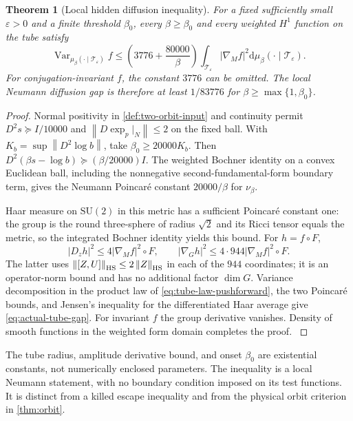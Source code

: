 \documentclass[11pt,oneside,openany]{book}
\newtheorem{theorem}{Theorem}[chapter]
\theoremstyle{definition}
\theoremstyle{remark}
\newcommand{\dd}{\mathrm d}
\newcommand{\Var}{\operatorname{Var}}
\newcommand{\SU}{\mathrm{SU}}
\newcommand{\norm}[1]{\left\lVert#1\right\rVert}
\newcommand{\src}[2]{\cite[#2]{#1}}
\begin{document}
\begin{theorem}[Local hidden diffusion inequality]
\label{thm:actual-tube-gap}
For a fixed sufficiently small $\varepsilon>0$ and a finite threshold
$\beta_0$, every $\beta\ge\beta_0$ and every weighted $H^1$ function
on the tube satisfy
\begin{equation}\label{eq:actual-tube-gap}
 \Var_{\mu_\beta(\cdot\mid\mathcal T_\varepsilon)}f
 \le\left(3776+\frac{80000}{\beta}\right)
     \int_{\mathcal T_\varepsilon}|\nabla_Mf|^2
                              \dd\mu_\beta(\cdot\mid\mathcal T_\varepsilon).
\end{equation}
For conjugation-invariant $f$, the constant $3776$ can be omitted.
The local Neumann diffusion gap is therefore at least $1/83776$ for
$\beta\ge\max\{1,\beta_0\}$.
\end{theorem}
\begin{proof}
Normal positivity in \cref{def:two-orbit-input} and continuity permit
$D^2s\succeq I/10000$ and $\norm{D\exp_p|_N}\le2$ on the fixed
ball. With $K_b=\sup\norm{D^2\log b}$, take
$\beta_0\ge20000K_b$. Then
$D^2(\beta s-\log b)\succeq(\beta/20000)I$.
The weighted Bochner identity on a convex Euclidean ball, including
the nonnegative second-fundamental-form boundary term, gives the
Neumann Poincar\'e constant $20000/\beta$ for $\nu_\beta$.

Haar measure on $\SU(2)$ in this metric has a sufficient Poincar\'e
constant one: the group is the round three-sphere of radius $\sqrt2$
and its Ricci tensor equals the metric, so the integrated Bochner
identity yields this bound. For $h=f\circ F$,
\[
 |D_zh|^2\le4|\nabla_Mf|^2\circ F,\qquad
 |\nabla_Gh|^2\le4\cdot944|\nabla_Mf|^2\circ F.
\]
The latter uses $\norm{[Z,U]}_{\rm HS}\le2\norm Z_{\rm HS}$
in each of the $944$ coordinates; it is an operator-norm bound and
has no additional factor $\dim G$. Variance decomposition in the
product law of \cref{eq:tube-law-pushforward}, the two Poincar\'e
bounds, and Jensen's inequality for the differentiated Haar average
give \cref{eq:actual-tube-gap}. For invariant $f$ the group derivative
vanishes. Density of smooth functions in the weighted form domain
completes the proof. \src{F13}{V1}
\end{proof}
The tube radius, amplitude derivative bound, and onset $\beta_0$ are
existential constants, not numerically enclosed parameters. The
inequality is a local Neumann statement, with no boundary condition
imposed on its test functions. It is distinct from a killed escape
inequality and from the physical orbit criterion in \cref{thm:orbit}.
\end{document}
